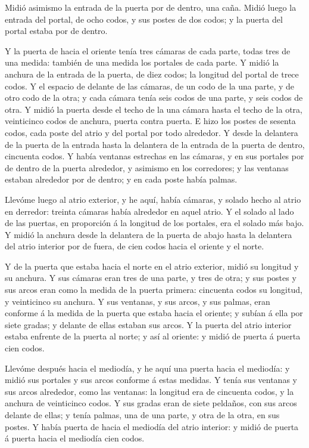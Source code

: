  Midió asimismo la entrada de la puerta por de dentro, una
caña.  Midió luego la entrada del portal, de ocho codos, y
sus postes de dos codos; y la puerta del portal estaba por de dentro.

 Y la puerta de hacia el oriente tenía tres cámaras de cada
parte, todas tres de una medida: también de una medida los portales de
cada parte.  Y midió la anchura de la entrada de la puerta,
de diez codos; la longitud del portal de trece codos.  Y el
espacio de delante de las cámaras, de un codo de la una parte, y de otro
codo de la otra; y cada cámara tenía seis codos de una parte, y seis
codos de otra.  Y midió la puerta desde el techo de la una
cámara hasta el techo de la otra, veinticinco codos de anchura, puerta
contra puerta.  E hizo los postes de sesenta codos, cada
poste del atrio y del portal por todo alrededor.  Y desde
la delantera de la puerta de la entrada hasta la delantera de la entrada
de la puerta de dentro, cincuenta codos.  Y había ventanas
estrechas en las cámaras, y en sus portales por de dentro de la puerta
alrededor, y asimismo en los corredores; y las ventanas estaban
alrededor por de dentro; y en cada poste había palmas.

 Llevóme luego al atrio exterior, y he aquí, había cámaras,
y solado hecho al atrio en derredor: treinta cámaras había alrededor en
aquel atrio.  Y el solado al lado de las puertas, en
proporción á la longitud de los portales, era el solado más bajo.
 Y midió la anchura desde la delantera de la puerta de
abajo hasta la delantera del atrio interior por de fuera, de cien codos
hacia el oriente y el norte.

 Y de la puerta que estaba hacia el norte en el atrio
exterior, midió su longitud y su anchura.  Y sus cámaras
eran tres de una parte, y tres de otra; y sus postes y sus arcos eran
como la medida de la puerta primera: cincuenta codos su longitud, y
veinticinco su anchura.  Y sus ventanas, y sus arcos, y sus
palmas, eran conforme á la medida de la puerta que estaba hacia el
oriente; y subían á ella por siete gradas; y delante de ellas estaban
sus arcos.  Y la puerta del atrio interior estaba enfrente
de la puerta al norte; y así al oriente: y midió de puerta á puerta cien
codos.

 Llevóme después hacia el mediodía, y he aquí una puerta
hacia el mediodía: y midió sus portales y sus arcos conforme á estas
medidas.  Y tenía sus ventanas y sus arcos alrededor, como
las ventanas: la longitud era de cincuenta codos, y la anchura de
veinticinco codos.  Y sus gradas eran de siete peldaños,
con sus arcos delante de ellas; y tenía palmas, una de una parte, y otra
de la otra, en sus postes.  Y había puerta de hacia el
mediodía del atrio interior: y midió de puerta á puerta hacia el
mediodía cien codos.

